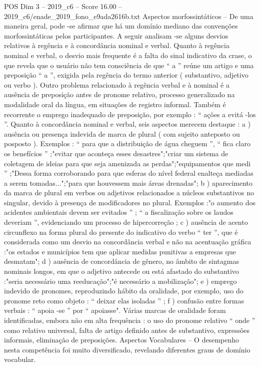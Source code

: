 \begin{textsample}{POS Dim 3 – 2019\_c6 – Score 16.00 – 2019\_c6/enade\_2019\_fono\_e9ada2616b.txt}
Aspectos morfossintáticos – De uma maneira geral, pode -se afirmar que há um domínio mediano das convenções morfossintáticas pelos participantes.
A seguir analisam -se alguns desvios relativos à regência e à concordância nominal e verbal.
Quanto à regência nominal e verbal, o desvio mais frequente é a falta do sinal indicativo da crase, o que revela que o usuário não tem consciência de que “ a ” reúne um artigo e uma preposição “ a ”, exigida pela regência do termo anterior ( substantivo, adjetivo ou verbo ).
Outro problema relacionado à regência verbal e à nominal é a ausência de preposição antes de pronome relativo, processo generalizado na modalidade oral da língua, em situações de registro informal.
Também é recorrente o emprego inadequado de preposição, por exemplo : “ ações a evitá -los ”.
Quanto à concordância nominal e verbal, seis aspectos merecem destaque : a ) ausência ou presença indevida de marca de plural ( com sujeito anteposto ou posposto ).
Exemplos : “ para que a distribuição de água cheguem ”, “ fica claro os benefícios ” ;"evitar que aconteça esses desastres";"criar um sistema de coletagem de ideias para que seja amenizada as perdas";"equipamentos que medi ” ;"Dessa forma corroborando para que esferas do nível federal enalteça mediadas a serem tomadas...";"para que houvessem mais áreas drenadas"; b ) aparecimento da marca de plural em verbos ou adjetivos relacionados a núcleos substantivos no singular, devido à presença de modificadores no plural.
Exemplos :"o aumento dos acidentes ambientais devem ser evitados ” ; “ a fiscalização sobre os laudos deveriam ”, evidenciando um processo de hipercorreção ; c ) ausência de acento circunflexo na forma plural do presente do indicativo do verbo “ ter ”, que é considerada como um desvio na concordância verbal e não na acentuação gráfica :"os estados e municípios tem que aplicar medidas punitivas a empresas que desmatam"; d ) ausência de concordância de gênero, no âmbito de sintagmas nominais longos, em que o adjetivo antecede ou está afastado do substantivo :"seria necessário uma reeducação";"é necessário a mobilização"; e ) emprego indevido de pronomes, reproduzindo hábito da oralidade, por exemplo, uso do pronome reto como objeto : “ deixar elas isoladas ” ; f ) confusão entre formas verbais : “ apoia -se ” por “ apoiasse".
Várias marcas de oralidade foram identificadas, embora não em alta frequência : o uso do pronome relativo “ onde ” como relativo universal, falta de artigo definido antes de substantivo, expressões informais, eliminação de preposições.
Aspectos Vocabulares – O desempenho nesta competência foi muito diversificado, revelando diferentes graus de domínio vocabular.

\end{textsample}
